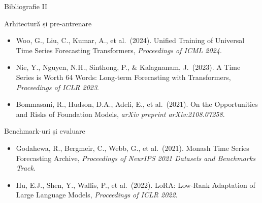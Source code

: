 \documentclass[9pt, aspectratio=169, t]{beamer}
\begin{document}
\begin{frame}{Bibliografie II}
    \begin{block}{Arhitectură și pre-antrenare}
        {\footnotesize
        \begin{itemize}\setlength{\itemsep}{0pt}
            \item Woo, G., Liu, C., Kumar, A., et al.\ (2024). Unified Training of Universal Time Series Forecasting Transformers, \textit{Proceedings of ICML 2024}.
            \item Nie, Y., Nguyen, N.H., Sinthong, P., \& Kalagnanam, J.\ (2023). A Time Series is Worth 64 Words: Long-term Forecasting with Transformers, \textit{Proceedings of ICLR 2023}.
            \item Bommasani, R., Hudson, D.A., Adeli, E., et al.\ (2021). On the Opportunities and Risks of Foundation Models, \textit{arXiv preprint arXiv:2108.07258}.
        \end{itemize}
        }
    \end{block}

    \begin{alertblock}{Benchmark-uri și evaluare}
        {\footnotesize
        \begin{itemize}\setlength{\itemsep}{0pt}
            \item Godahewa, R., Bergmeir, C., Webb, G., et al.\ (2021). Monash Time Series Forecasting Archive, \textit{Proceedings of NeurIPS 2021 Datasets and Benchmarks Track}.
            \item Hu, E.J., Shen, Y., Wallis, P., et al.\ (2022). LoRA: Low-Rank Adaptation of Large Language Models, \textit{Proceedings of ICLR 2022}.
        \end{itemize}
        }
    \end{alertblock}
\end{frame}
\end{document}
